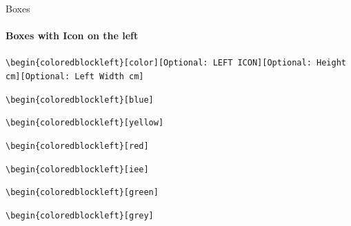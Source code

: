 \documentclass[aspectratio=169]{beamer}
\begin{document}
\begin{frame}{Boxes}
    \framesubtitle{Boxes with Icon on the left}

    \footnotesize\centering\texttt{\textbackslash begin\{coloredblockleft\}[color][Optional:~LEFT ICON][Optional:~Height cm][Optional:~Left Width cm]}
    
    \begin{minipage}[t]{0.49\textwidth}

        \begin{coloredblockleft}
            \vspace{0.3cm}
            \texttt{\textbackslash begin\{coloredblockleft\}[blue]}\strut
        \end{coloredblockleft}

        \begin{coloredblockleft}
            \vspace{0.3cm}
            \texttt{\textbackslash begin\{coloredblockleft\}[yellow]}\strut
        \end{coloredblockleft}

        \begin{coloredblockleft}
            \vspace{0.3cm}
            \texttt{\textbackslash begin\{coloredblockleft\}[red]}\strut
        \end{coloredblockleft}

    \end{minipage}
    \hfill
    \begin{minipage}[t]{0.49\textwidth}
        
        \begin{coloredblockleft}
            \vspace{0.3cm}
            \texttt{\textbackslash begin\{coloredblockleft\}[iee]}\strut
        \end{coloredblockleft}

        \begin{coloredblockleft}
            \vspace{0.3cm}
            \texttt{\textbackslash begin\{coloredblockleft\}[green]}\strut
        \end{coloredblockleft}

        \begin{coloredblockleft}
            \vspace{0.3cm}
            \texttt{\textbackslash begin\{coloredblockleft\}[grey]}\strut
        \end{coloredblockleft}
        

\end{minipage}
\end{frame}
\end{document}
